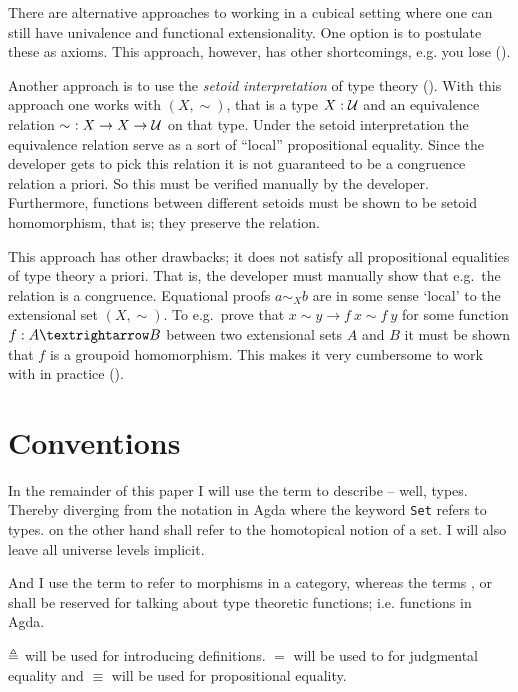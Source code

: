 There are alternative approaches to working in a cubical setting where
one can still have univalence and functional extensionality. One
option is to postulate these as axioms. This approach, however, has
other shortcomings, e.g. you lose 
(\cite[p. 3]{huber-2016}).

Another approach is to use the \emph{setoid interpretation} of type
theory (\cite{hofmann-1995,huber-2016}). With this approach one works
with  $(X, \sim)$, that is a type $X \mathrel{:}
\mathcal{U}$ and an equivalence relation $\sim\ \mathrel{:} X \to X \to \mathcal{U}$ on that
type. Under the setoid interpretation the equivalence relation serve
as a sort of ``local'' propositional equality. Since the developer
gets to pick this relation it is not guaranteed to be a congruence
relation a priori. So this must be verified manually by the developer.
Furthermore, functions between different setoids must be shown to be
setoid homomorphism, that is; they preserve the relation.

This approach has other drawbacks; it does not satisfy all
propositional equalities of type theory a priori. That is, the
developer must manually show that e.g.\ the relation is a congruence.
Equational proofs $a \sim_{X} b$ are in some sense `local' to the
extensional set $(X , \sim)$. To e.g.\ prove that $x ∼ y → f\ x ∼
f\ y$ for some function $f \tp A → B$ between two extensional sets $A$
and $B$ it must be shown that $f$ is a groupoid homomorphism. This
makes it very cumbersome to work with in practice (\cite[p.
  4]{huber-2016}).

\section{Conventions}
In the remainder of this paper I will use the term
 to describe --
well, types. Thereby diverging from the notation in Agda where the keyword
\texttt{Set} refers to types.
 on the other hand shall refer to the
homotopical notion of a set. I will also leave all universe levels implicit.

And I use the term
 to refer to morphisms in a category,
whereas the terms
,
 or
shall be reserved for talking about type theoretic functions; i.e.
functions in Agda.

$\mathrel{\triangleq}$ will be used for introducing definitions. $=$ will be used to for
judgmental equality and $\equiv$ will be used for propositional equality.

